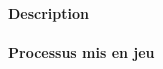 \paragraph{Description} %
\label{par:buchnera_description}

\cite{dunbar2007}

\paragraph{Processus mis en jeu} %
\label{par:buchnera_process}

